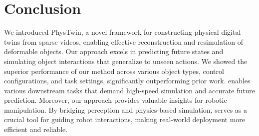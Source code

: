 \section{Conclusion}
We introduced PhysTwin, a novel framework for constructing physical digital twins from sparse videos, enabling effective reconstruction and resimulation of deformable objects. Our approach excels in predicting future states and simulating object interactions that generalize to unseen actions. 
We showed the superior performance of our method across various object types, control configurations, and task settings, significantly outperforming prior work. 
\ourabbr enables various downstream tasks that demand high-speed simulation and accurate future prediction. 
Moreover, our approach provides valuable insights for robotic manipulation. By bridging perception and physics-based simulation, \ourabbr serves as a crucial tool for guiding robot interactions, making real-world deployment more efficient and reliable.
